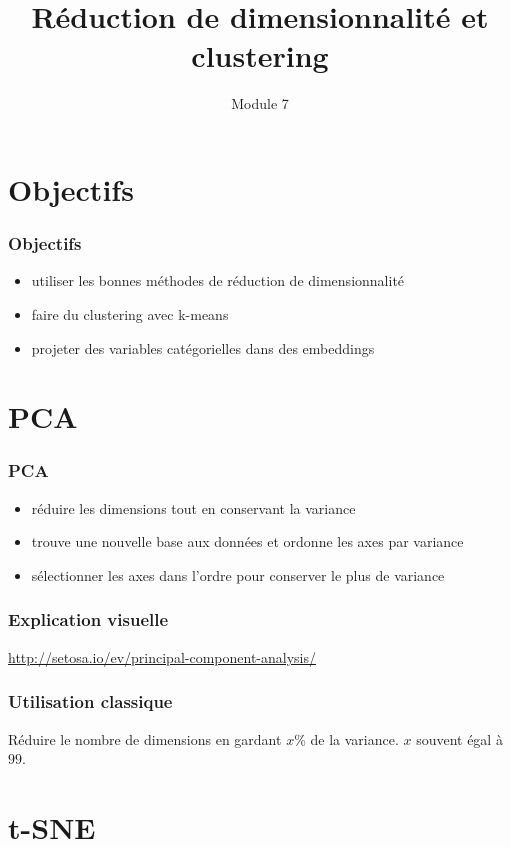 \documentclass{formation}
\title{Réduction de dimensionnalité et clustering}
\subtitle{Module 7}
\begin{document}
\maketitle

\section{Objectifs}

\begin{frame}
  \frametitle{Objectifs}
  \begin{itemize}
  \item utiliser les bonnes méthodes de réduction de dimensionnalité
  \item faire du clustering avec k-means
  \item projeter des variables catégorielles dans des embeddings
  \end{itemize}
\end{frame}

\section{PCA}

\begin{frame}
  \frametitle{PCA}

  \begin{itemize}
  \item réduire les dimensions tout en conservant la variance
  \item trouve une nouvelle base aux données et ordonne les axes par
    variance
  \item sélectionner les axes dans l'ordre pour conserver le plus de
    variance
  \end{itemize}
\end{frame}

\begin{frame}
  \frametitle{Explication visuelle}

  \url{http://setosa.io/ev/principal-component-analysis/}
\end{frame}

\begin{frame}
  \frametitle{Utilisation classique}

  Réduire le nombre de dimensions en gardant $x$\% de la variance. $x$
  souvent égal à $99$.
\end{frame}

\section{t-SNE}
\end{document}
